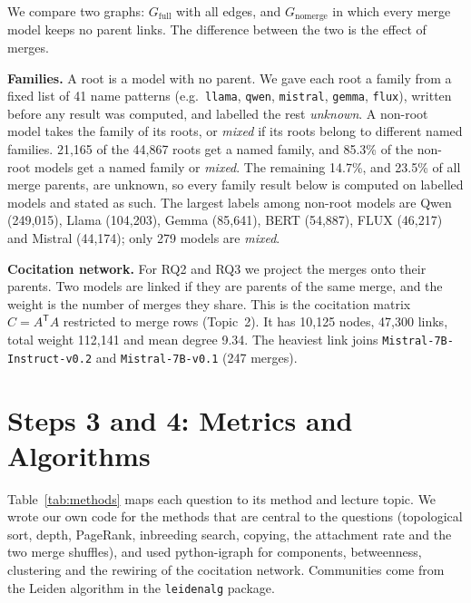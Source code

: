 \documentclass[conference]{IEEEtran}
\newcommand{\model}[1]{\texttt{\small #1}}
\begin{document}
We compare two graphs: $G_{\text{full}}$ with all edges, and
$G_{\text{nomerge}}$ in which every merge model keeps no parent links. The
difference between the two is the effect of merges.

\textbf{Families.} A root is a model with no parent. We gave each root a family
from a fixed list of 41 name patterns (e.g.\ \texttt{llama}, \texttt{qwen},
\texttt{mistral}, \texttt{gemma}, \texttt{flux}), written before any result was
computed, and labelled the rest \emph{unknown}. A non-root model takes the
family of its roots, or \emph{mixed} if its roots belong to different named
families. 21,165 of the 44,867 roots get a named family, and 85.3\% of the
non-root models get a named family or \emph{mixed}. The remaining 14.7\%, and
23.5\% of all merge parents, are unknown, so every family result below is
computed on labelled models and stated as such. The largest labels among
non-root models are Qwen (249,015), Llama (104,203), Gemma (85,641), BERT
(54,887), FLUX (46,217) and Mistral (44,174); only 279 models are \emph{mixed}.

\textbf{Cocitation network.} For RQ2 and RQ3 we project the merges onto their
parents. Two models are linked if they are parents of the same merge, and the
weight is the number of merges they share. This is the cocitation matrix
$C = A^{\mathsf T}A$ restricted to merge rows (Topic~2). It has 10,125 nodes,
47,300 links, total weight 112,141 and mean degree 9.34. The heaviest link joins
\model{Mistral-7B-Instruct-v0.2} and \model{Mistral-7B-v0.1} (247 merges).

\section{Steps 3 and 4: Metrics and Algorithms}

Table~\ref{tab:methods} maps each question to its method and lecture topic.
We wrote our own code for the methods that are central to the questions
(topological sort, depth, PageRank, inbreeding search, copying, the attachment
rate and the two merge shuffles), and used python-igraph \cite{igraph} for
components, betweenness, clustering and the rewiring of the cocitation network. Communities come from the Leiden algorithm
\cite{traag2019} in the \texttt{leidenalg} package.
\end{document}
